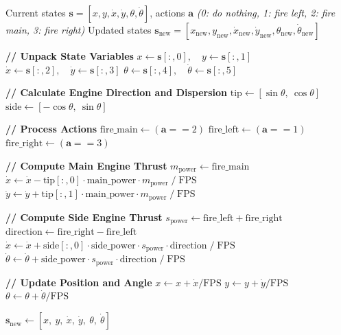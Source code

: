 \documentclass[nonacm,sigconf]{acmart}
\begin{document}
\newpage



\begin{algorithm}[h]
\caption{Dynamics of Lunar Lander}
\label{alg:lunar_lander_dynamics}
\begin{algorithmic}[1]
\Require Current states
         $\mathbf{s} = [x, y, \dot{x}, \dot{y}, \theta, \dot{\theta}]$,
         actions $\mathbf{a}$
         \textit{(0: do nothing, 1: fire left, 2: fire main, 3: fire right)}
\Ensure  Updated states
         $\mathbf{s}_{\text{new}} =
         [x_{\text{new}}, y_{\text{new}},
          \dot{x}_{\text{new}}, \dot{y}_{\text{new}},
          \theta_{\text{new}}, \dot{\theta}_{\text{new}}]$

\State \textbf{// Unpack State Variables}
\State $x \gets \mathbf{s}[:,0],\quad y \gets \mathbf{s}[:,1]$
\State $\dot{x} \gets \mathbf{s}[:,2],\quad \dot{y} \gets \mathbf{s}[:,3]$
\State $\theta \gets \mathbf{s}[:,4],\quad \dot{\theta} \gets \mathbf{s}[:,5]$

\State \textbf{// Calculate Engine Direction and Dispersion}
\State $\text{tip}  \gets [\sin\theta,\ \cos\theta]$
\State $\text{side} \gets [-\cos\theta,\ \sin\theta]$

\State \textbf{// Process Actions}
\State $\text{fire\_main}  \gets (\mathbf{a} == 2)$
\State $\text{fire\_left}  \gets (\mathbf{a} == 1)$
\State $\text{fire\_right} \gets (\mathbf{a} == 3)$

\State \textbf{// Compute Main Engine Thrust}
\State $m_{\text{power}} \gets \text{fire\_main}$
\State $\dot{x} \gets \dot{x}
       - \text{tip}[:,0] \cdot \text{main\_power}
         \cdot m_{\text{power}} \;/\; \text{FPS}$
\State $\dot{y} \gets \dot{y}
       + \text{tip}[:,1] \cdot \text{main\_power}
         \cdot m_{\text{power}} \;/\; \text{FPS}$

\State \textbf{// Compute Side Engine Thrust}
\State $s_{\text{power}}  \gets \text{fire\_left} + \text{fire\_right}$
\State $\text{direction}  \gets \text{fire\_right} - \text{fire\_left}$
\State $\dot{x} \gets \dot{x}
       + \text{side}[:,0] \cdot \text{side\_power}
         \cdot s_{\text{power}} \cdot \text{direction} \;/\; \text{FPS}$
\State $\dot{\theta} \gets \dot{\theta}
       + \text{side\_power} \cdot s_{\text{power}}
         \cdot \text{direction} \;/\; \text{FPS}$

\State \textbf{// Update Position and Angle}
\State $x      \gets x      + \dot{x}      / \text{FPS}$
\State $y      \gets y      + \dot{y}      / \text{FPS}$
\State $\theta \gets \theta + \dot{\theta} / \text{FPS}$

\State \Return
       $\mathbf{s}_{\text{new}} \gets
       [x,\ y,\ \dot{x},\ \dot{y},\ \theta,\ \dot{\theta}]$
\end{algorithmic}
\end{algorithm}
\end{document}
